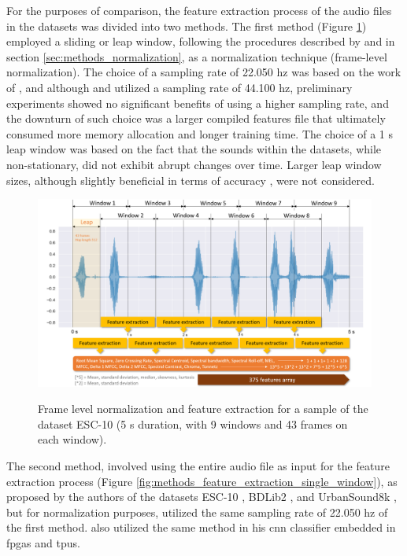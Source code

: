 For the purposes of comparison, the feature extraction process of the audio files in the datasets was divided into two methods. The first method (Figure \ref{fig:methods_feature_extraction_leap_window}) employed a sliding or leap window, following the procedures described by \textcite{Silva2019} and \textcite{Lhoest2021} in section \ref{sec:methods_normalization}, as a normalization technique (frame-level normalization). The choice of a sampling rate of 22.050 \gls{hz} was based on the work of \textcite{Salamon2017}, and although \textcite{PiczakESC2015} and \textcite{Bountourakis2015} utilized a sampling rate of 44.100 \gls{hz}, preliminary experiments showed no significant benefits of using a higher sampling rate, and the downturn of such choice was a larger compiled features file that ultimately consumed more memory allocation and longer training time. The choice of a 1 \gls{s} leap window was based on the fact that the sounds within the datasets, while non-stationary, did not exhibit abrupt changes over time. Larger leap window sizes, although slightly beneficial in terms of accuracy \cite{Salamon2017}, were not considered. 

\begin{figure}[htbp]
    \raggedright
        \caption{Frame level normalization and feature extraction for a sample of the dataset ESC-10 (5 \gls{s} duration, with 9 windows and 43 frames on each window).}
        \includegraphics[width=1\textwidth]{resources/images/050-methods/Methods_feature_extraction_1_BDLib2.png}
        \label{fig:methods_feature_extraction_leap_window}
\end{figure}

The second method, involved using the entire audio file as input for the feature extraction process (Figure \ref{fig:methods_feature_extraction_single_window}), as proposed by the authors of the datasets ESC-10 \cite{PiczakESC2015}, BDLib2 \cite{Bountourakis2015}, and UrbanSound8k \cite{Salamon2017}, but for normalization purposes, utilized the same sampling rate of 22.050 \gls{hz} of the first method. \Textcite{Vandendriessche2021} also utilized the same method in his \gls{cnn} classifier embedded in \gls{fpga}s and \gls{tpu}s.


